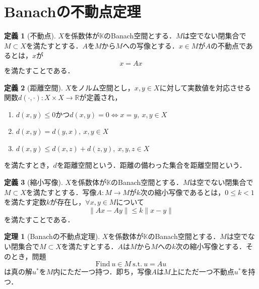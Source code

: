 \documentclass[11pt,a4paper,titlepage]{jsreport}
\theoremstyle{definition}
\newtheorem{dfn}{定義}
\newtheorem{thm}{定理}
\begin{document}
\section{Banachの不動点定理}
\begin{dfn}[不動点]
  $X$を係数体が$\mathbb{K}$のBanach空間とする．$M$は空でない閉集合で$M\subset X$を満たすとする．$A$を$M$から$M$への写像とする．$x\in M$が$A$の不動点であるとは，$x$が
  \begin{equation*}
    x=Ax
  \end{equation*}
  を満たすことである．
\end{dfn}

\begin{dfn}[距離空間]
  $X$をノルム空間とし，$x,y\in X$に対して実数値を対応させる関数$d(\cdot,\cdot):X\times X\rightarrow \mathbb{R}$が定義され，
  \begin{enumerate}
    \item $d(x,y) \leq 0$かつ$d(x,y)=0 \Leftrightarrow x=y,\ x,y\in X$
    \item $d(x,y)=d(y,x),\ x,y\in X$
    \item $d(x,y)\leq d(x,z) + d(z,y),\ x,y,z\in X$
  \end{enumerate}
  を満たすとき，$d$を距離空間という．距離の備わった集合を距離空間という．
\end{dfn}

\begin{dfn}[縮小写像]
  $X$を係数体が$\mathbb{K}$のBanach空間とする．$M$は空でない閉集合で$M\subset X$を満たすとする．写像$A:M\rightarrow M$が$k$次の縮小写像であるとは，$0\leq k<1$を満たす定数$k$が存在し，$\forall x,y \in M$について
  \begin{equation*}
    \|Ax-Ay\|\leq k\|x-y\|
  \end{equation*}
  を満たすことである．
\end{dfn}

\begin{thm}[Banachの不動点定理]
  \label{thm:Banachの不動点定理}
  $X$を係数体が$\mathbb{K}$のBanach空間とする．$M$は空でない閉集合で$M\subset X$を満たすとする．$A$は$M$から$M$への$k$次の縮小写像とする．そのとき，問題
  \begin{equation}
    \label{equ:Banachの不動点定理}
    \mathrm{Find}\ u\in M\ \mathrm{s.t.} \ u=Au
  \end{equation}
  は真の解$u^*$を$M$内にただ一つ持つ．即ち，写像$A$は$M$上にただ一つ不動点$u^*$を持つ．
\end{thm}
\end{document}
